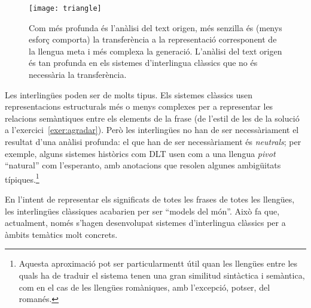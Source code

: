 \begin{figure}
\begin{center}
\texttt{[image: triangle]}
\end{center}
\caption{Com més profunda és l'anàlisi del text origen,
  més senzilla és (menys esforç comporta) la transferència a la
  representació corresponent de la llengua meta i més complexa la
  generació.  L'anàlisi del text origen és tan profunda en els
  sistemes d'interlingua clàssics que no és necessària la transferència.}
\label{fg:triangle}
\end{figure}

Les interlingües poden ser de molts tipus. Els sistemes clàssics usen
representacions estructurals més o menys complexes per a representar
les relacions semàntiques entre els elements de la frase (de l'estil
de les de la solució a l'exercici~\ref{exer:agradar}).  Però les
interlingües no han de ser necessàriament el resultat d'una anàlisi
profunda: el que han de ser necessàriament és \emph{neutrals}; per
exemple, alguns sistemes històrics com DLT \citep[cap.~17]{hutchins92b} usen com
a una llengua \emph{pivot} ``natural'' com l'esperanto, amb anotacions
que resolen algunes ambigüitats típiques.\footnote{Aquesta aproximació
  pot ser particularmentt útil quan les llengües entre les quals ha de
  traduir el sistema tenen una gran similitud sintàctica i semàntica,
  com en el cas de les llengües romàniques, amb l'excepció, potser,
  del romanés.}

En l'intent de representar els significats de totes les frases de
totes les llengües, les interlingües clàssiques acabarien per ser
``models del món''. Això fa que, actualment, només s'hagen
desenvolupat sistemes d'interlingua clàssics per a àmbits temàtics
molt concrets.

